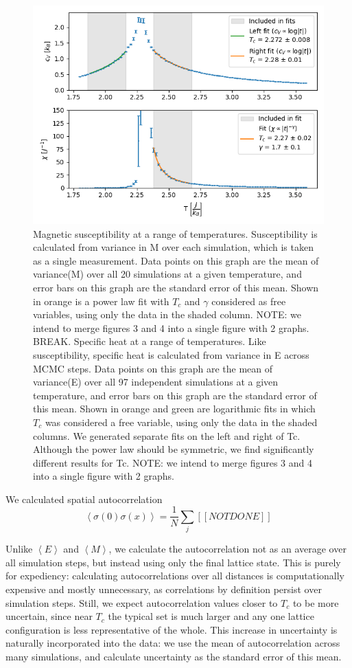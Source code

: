 \documentclass[letter,scriptaddress,twocolumn, prl,nofootinbib]{revtex4}
\newcommand{\submin}[1]{\left\langle #1 \right\rangle}
\begin{document}
\begin{figure}[h]
	\begin{center}
		\includegraphics[width=.4\textwidth]{figs/fig3.png}
		\caption{Magnetic susceptibility at a range of temperatures. Susceptibility is calculated from variance in M over each simulation, which is taken as a single measurement. Data points on this graph are the mean of variance(M) over all 20 simulations at a given temperature, and error bars on this graph are the standard error of this mean. Shown in orange is a power law fit with $T_c$ and $\gamma$ considered as free variables, using only the data in the shaded column. NOTE: we intend to merge figures 3 and 4 into a single figure with 2 graphs. BREAK. Specific heat at a range of temperatures. Like susceptibility, specific heat is calculated from variance in E across MCMC steps. Data points on this graph are the mean of variance(E) over all 97 independent simulations at a given temperature, and error bars on this graph are the standard error of this mean. Shown in orange and green are logarithmic fits in which $T_c$ was considered a free variable, using only the data in the shaded columns. We generated separate fits on the left and right of Tc. Although the power law should be symmetric, we find significantly different results for Tc. NOTE: we intend to merge figures 3 and 4 into a single figure with 2 graphs.}
		\label{fig:fig3}
	\end{center}
\end{figure}

We calculated spatial autocorrelation 
\begin{equation}
	\label{autocor}
	\submin{\sigma(0)\sigma(x)} = \frac{1}{N}\sum_{j} [[NOT DONE]]
\end{equation}

Unlike $\submin{E}$ and $\submin{M}$, we calculate the autocorrelation not as an average over all simulation steps, but instead using only the final lattice state. This is purely for expediency: calculating autocorrelations over all distances is computationally expensive and mostly unnecessary, as correlations by definition persist over simulation steps. Still, we expect autocorrelation values closer to $T_c$ to be more uncertain, since near $T_c$ the typical set is much larger and any one lattice configuration is less representative of the whole. This increase in uncertainty is naturally incorporated into the data: we use the mean of autocorrelation across many simulations, and calculate uncertainty as the standard error of this mean.
\end{document}
